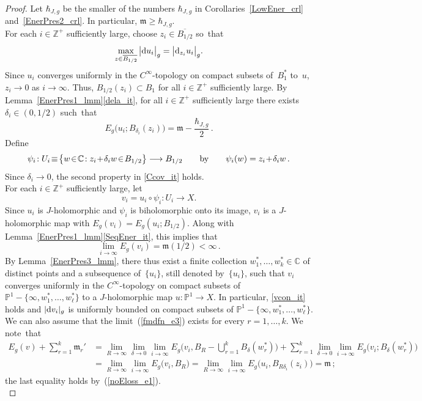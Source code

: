 \documentclass[11pt]{article}
\numberwithin{equation}{section}
\theoremstyle{definition}
\def\BE#1{\begin{equation}\label{#1}}
\def\EE{\end{equation}}
\def\eref#1{(\ref{#1})}
\def\ov#1{\overline{#1}}
\def\lra{\longrightarrow}
\def\C{\mathbb{C}}
\def\fm{\mathfrak m}
\def\P{\mathbb{P}}
\def\Z{{\mathbb Z}}
\def\de{\delta}
\def\i{\infty}
\def\hb{\hbar}
\def\nd{\textnormal{d}}
\begin{document}
\begin{proof}
Let $\hb_{J,g}$ be the smaller of the numbers $\hb_{J,g}$
in Corollaries~\ref{LowEner_crl} and~\ref{EnerPres2_crl}.
In particular, $\fm\!\ge\!\hb_{J,g}$.\\

\noindent
For each $i\!\in\!\Z^+$ sufficiently large, choose $z_i\!\in\!\ov{B_{1/2}}$ so~that
\BE{maxdui_e} \max_{z\in \ov{B_{1/2}}}\big|\nd u_i\big|_g=\big|\nd_{z_i}u_i\big|_g.\EE
Since $u_i$ converges
uniformly in the $C^{\i}$-topology on compact subsets of~$B_1^*$ to~$u$,
$z_i\!\lra\!0$ as $i\!\lra\!\i$.
Thus,  $B_{1/2}(z_i)\!\subset\!B_1$
for all $i\!\in\!\Z^+$ sufficiently large.
By Lemma~\ref{EnerPres1_lmm}\ref{dela_it},
for all $i\!\in\!\Z^+$ sufficiently large there exists $\de_i\!\in\!(0,1/2)$
such~that 
\BE{dejidfn_e} E_g\big(u_i;B_{\de_i}(z_i)\big)=\fm-\frac{\hb_{J,g}}{2}\,.\EE
Define
$$\psi_i\!:U_i\!\equiv\!\big\{w\!\in\!\C\!: z_i\!+\!\de_iw\!\in\!B_{1/2}\big\}
\lra B_{1/2}
\qquad\hbox{by}\qquad \psi_i(w)=z_i\!+\!\de_iw\,.$$
Since $\de_i\!\lra\!0$, the second property in \ref{Ccov_it} holds.\\

\noindent
For each $i\!\in\!\Z^+$ sufficiently large, let
$$v_i=u_i\!\circ\!\psi_i\!:  U_i\lra X.$$
Since $u_i$ is $J$-holomorphic and $\psi_i$ is biholomorphic onto its image,
$v_i$ is a $J$-holomorphic map with \hbox{$E_g(v_i)=E_g(u_i;B_{1/2})$}.
Along with Lemma~\ref{EnerPres1_lmm}\ref{SeqEner_it}, this implies that
$$\lim_{i\lra\i}E_g(v_i)=\fm(1/2)<\i\,.$$
By Lemma~\ref{EnerPres3_lmm}, there thus exist a finite collection 
$w_1^*,\ldots,w_k^*\!\in\!\C$ of distinct points 
and a subsequence of~$\{u_i\}$, still denoted by~$\{u_i\}$, 
such that $v_i$ converges uniformly in the $C^{\i}$-topology
on compact subsets  of $\P^1\!-\!\{\i,w_1^*,\ldots,w_{\ell}^*\}$
to a $J$-holomorphic map $u\!:\P^1\!\lra\!X$.
In particular, \ref{vcon_it} holds and
$|\nd v_i|_g$ is uniformly bounded on compact subsets 
of $\P^1\!-\!\{\i,w_1^*,\ldots,w_{\ell}^*\}$.
We can also assume that the limit~\eref{fmdfn_e3}
exists for every $r\!=\!1,\ldots,k$.
We note~that
\BE{EnerBub_e}\begin{split}
E_g(v)+\!\sum_{r=1}^k\!\fm_r' 
&=\lim_{R\lra\i}\lim_{\de\lra0}\lim_{i\lra\i}\!\!
E_g\!\big(v_i,B_R\!-\!\bigcup_{r=1}^k\! B_{\de}(w_r^*)\big)
+\sum_{r=1}^k\lim_{\de\lra0}\lim_{i\lra\i}\!\!E_g\big(v_i;B_{\de}(w_r^*)\big)\\
&=\lim_{R\lra\i}\lim_{i\lra\i}\!\!E_g\big(v_i,B_R\big)
=\lim_{R\lra\i}\lim_{i\lra\i}\!\!E_g\big(u_i,B_{R\de_i}(z_i)\big)=\fm\,;
\end{split}\EE
the last equality holds by~\eref{noEloss_e1}.\\



\end{proof}
\end{document}
